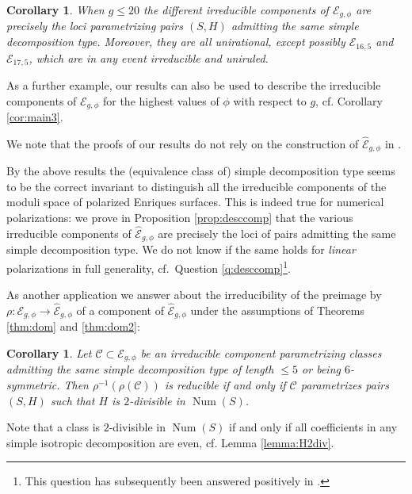 \documentclass[11pt]{amsart}
\newtheorem{corollary}[thm]{Corollary}
\theoremstyle{definition}
\def\E{{\mathcal E}}
\def\C{{\mathcal C}}
\def\Num{\operatorname{Num}}
\begin{document}
\begin{corollary} \label{cor:main2}
  When $g \leqslant 20$ the different  irreducible  components of $\E_{g,\phi}$ are precisely the loci  parametrizing pairs $(S,H)$  admitting the same simple decomposition 
type.  Moreover, they are all unirational, except possibly $\E_{16,5}$
and $\E_{17,5}$, which are 
in any event
irreducible and uniruled. 
\end{corollary}

As a further example, our results can also be used to describe the
 irreducible components of $\E_{g,\phi}$ for the highest values of
$\phi$ with respect to $g$, cf. Corollary \ref{cor:main3}.



  We note that the  proofs of our results 
 do not rely on the  construction of $\widehat{\E}_{g,\phi}$ in   \cite{GrHu}.

  By the above results  the (equivalence class of)  simple decomposition type seems to be the correct invariant to  distinguish  all the irreducible components of the moduli space of polarized Enriques
 surfaces. 
This is indeed true for numerical polarizations: we prove in 
Proposition \ref{prop:desccomp} that
the various  irreducible  components of $\widehat{\E}_{g,\phi}$ are
precisely the loci of pairs  admitting the same  simple decomposition
type.
 We do not know if the same holds for {\it linear} polarizations in
 full generality, cf.\ Question \ref{q:desccomp}\footnote
 {This question has subsequently been answered positively in  \cite[Thm.~1.1]{kn-JMPA}. }.


 
  



  

As another  application we   answer
\cite[Question 4.2]{GrHu} about
the irreducibility of the  preimage by
$\rho: \E_{g,\phi} \to \widehat{\E}_{g,\phi}$ of a component of
$\widehat{\E}_{g,\phi}$
under the assumptions of Theorems \ref{thm:dom}
and \ref{thm:dom2}:

\begin{corollary} \label{cor:conn}
Let $\C \subset \E_{g,\phi}$ be an irreducible component parametrizing
classes admitting the same simple decomposition type of length
$\leqslant 5$ or being $6$-symmetric.  Then $\rho^{-1}(\rho(\C))$ is
 reducible  if and only if $\C$ parametrizes  pairs $(S,H)$ such that $H$ is
$2$-divisible in $\Num(S)$. 
\end{corollary}

 Note that a class is $2$-divisible in $\Num(S)$ if and only if all coefficients in any simple isotropic decomposition are even, cf. Lemma \ref{lemma:H2div}.
\end{document}
